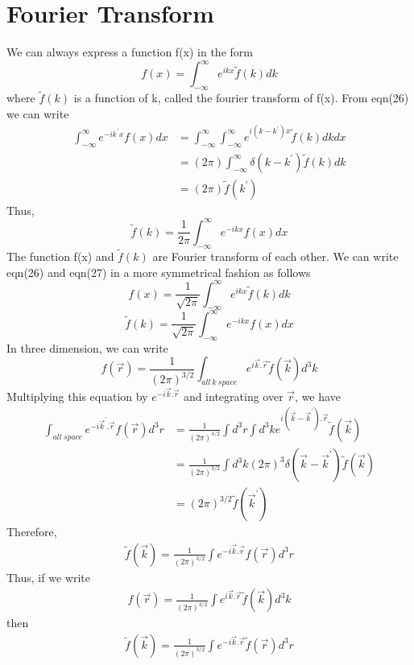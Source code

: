 \section*{Fourier Transform}
We can always express a function f(x) in the form 
\begin{equation}
f(x) = \int_{-\infty}^{\infty} e^{ikx} \tilde{f}(k) dk
\end{equation}
where $\tilde{f}(k)$ is a function of k, called the fourier transform of f(x). From eqn(26) we can write 
\begin{align*}
\int_{-\infty}^{\infty} e^{-ik^\prime x} f(x) dx &= \int_{-\infty}^{\infty} \int_{-\infty}^{\infty} e^{i(k-k^\prime) x} \tilde{f}(k) dk dx \\
&= (2\pi) \int_{-\infty}^{\infty} \delta(k - k^\prime) \tilde{f}(k) dk \\
&= (2\pi) \tilde{f}(k^\prime) 
\end{align*}
Thus,
\begin{equation}
\tilde{f}(k) = \frac{1}{2 \pi} \int_{-\infty}^{\infty} e^{-ikx} f(x) dx
\end{equation}
The function f(x) and $\tilde{f} (k)$ are Fourier transform of each other. We can write eqn(26) and eqn(27) in a more symmetrical fashion as follows
\begin{equation}
f(x)= \frac{1}{\sqrt{2 \pi}} \int_{-\infty}^{\infty} e^{ikx} \tilde{f}(k) dk
\end{equation}
\begin{equation}
\tilde{f}(k) = \frac{1}{\sqrt{2 \pi}} \int_{-\infty}^{\infty} e^{-ikx} f(x) dx
\end{equation}
In three dimension, we can write
\begin{equation}
f(\vec{r})= \frac{1}{(2 \pi)^{3/2}} \int_{all\ k \ space}  e^{i \vec{k}.\vec{r}} \tilde{f}(\vec{k}) d^3k
\end{equation}
Multiplying this equation by $e^{-i \vec{k}.\vec{r}}$ and integrating over $\vec{r}$, we have
\begin{align*}
\int_{all\ space}  e^{-i \vec{k}^\prime.\vec{r}} f(\vec{r}) d^3r &= \frac{1}{(2 \pi)^{3/2}} \int d^3r \int d^3k e^{i(\vec{k} - \vec{k}^\prime).\vec{r}} \tilde{f}(\vec{k}) \\
&= \frac{1}{(2 \pi)^{3/2}} \int d^3k (2 \pi)^3 \delta (\vec{k} - \vec{k}^\prime) \tilde{f}(\vec{k}) \\
&= (2 \pi)^{3/2} \tilde{f}(\vec{k}^\prime)
\end{align*}
Therefore,
\begin{align*}
\tilde{f}(\vec{k}) = \frac{1}{(2 \pi)^{3/2}} \int e^{-i \vec{k}.\vec{r}} f(\vec{r}) d^3r  
\end{align*}
Thus, if we write
\begin{align*}
f(\vec{r}) = \frac{1}{(2 \pi)^{3/2}} \int e^{i \vec{k}.\vec{r}} \tilde{f}(\vec{k}) d^3k 
\end{align*}
then
\begin{align*}
\tilde{f}(\vec{k}) = \frac{1}{(2 \pi)^{3/2}} \int e^{-i \vec{k}.\vec{r}} \tilde{f}(\vec{r}) d^3r 
\end{align*}

